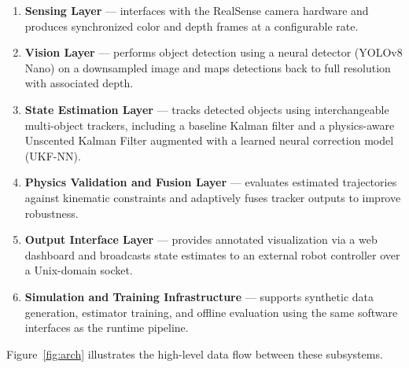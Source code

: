 \documentclass[11pt, letterpaper]{article}
\begin{document}
\begin{enumerate}[leftmargin=2em, itemsep=4pt]
  \item \textbf{Sensing Layer} ---
        interfaces with the RealSense camera hardware and produces
        synchronized color and depth frames at a configurable rate.

  \item \textbf{Vision Layer} ---
        performs object detection using a neural detector (YOLOv8 Nano)
        on a downsampled image and maps detections back to full
        resolution with associated depth.

  \item \textbf{State Estimation Layer} ---
        tracks detected objects using interchangeable multi-object
        trackers, including a baseline Kalman filter and a
        physics-aware Unscented Kalman Filter augmented with a learned
        neural correction model (UKF-NN).

  \item \textbf{Physics Validation and Fusion Layer} ---
        evaluates estimated trajectories against kinematic constraints
        and adaptively fuses tracker outputs to improve robustness.

  \item \textbf{Output Interface Layer} ---
        provides annotated visualization via a web dashboard and
        broadcasts state estimates to an external robot controller
        over a Unix-domain socket.

  \item \textbf{Simulation and Training Infrastructure} ---
        supports synthetic data generation, estimator training, and
        offline evaluation using the same software interfaces as the
        runtime pipeline.
\end{enumerate}

\noindent
Figure~\ref{fig:arch} illustrates the high-level data flow between
these subsystems.
\end{document}
